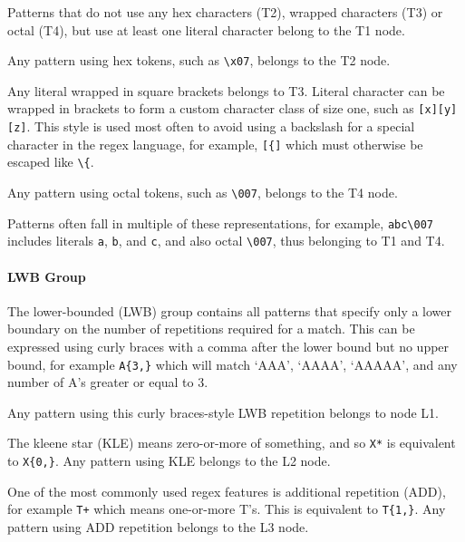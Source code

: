 \begin{description}  \itemsep -1pt
\item[T1:] Patterns that do not use any hex characters (T2), wrapped characters (T3) or octal (T4), but use at least one literal character belong to the T1 node.
\item[T2:] Any pattern using hex tokens, such as \verb!\x07!, belongs to the T2 node.
\item[T3:]  Any literal wrapped in square brackets belongs to T3.
Literal character can be wrapped in brackets to form a custom character class of size one, such as \verb![x][y][z]!. This style is used most often to avoid using a backslash for a special character in the regex language, for example, \verb![{]! which must otherwise be escaped like \verb!\{!.

\item[T4:] Any pattern using octal tokens, such as \verb!\007!, belongs to the T4 node.
\end{description}

Patterns often fall in multiple of these representations, for example, \verb!abc\007! includes literals \verb!a!, \verb!b!, and \verb!c!, and also octal \verb!\007!, thus belonging to T1 and T4.

\paragraph{LWB Group}
The lower-bounded (LWB) group contains all patterns that specify only a lower boundary on the number of repetitions required for a match.  This can be expressed using curly braces with a comma after the lower bound but no upper bound, for example \verb!A{3,}! which will match `AAA', `AAAA', `AAAAA', and any number of A's greater or equal to 3.

\begin{description}  \itemsep -1pt
\item[L1:] Any pattern using this curly braces-style LWB repetition belongs to node L1.
\item[L2:] The kleene star (KLE) means zero-or-more of something, and so \verb!X*! is equivalent to \verb!X{0,}!.  Any pattern using KLE belongs to the L2 node.
\item[L3:] One of the most commonly used regex features is additional repetition (ADD), for example \verb!T+! which means one-or-more T's.  This is equivalent to \verb!T{1,}!.  Any pattern using ADD repetition belongs to the L3 node.
\end{description}

